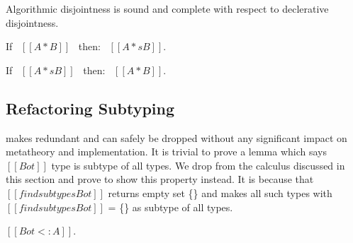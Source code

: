 Algorithmic disjointness is sound and complete with respect to declerative disjointness.

\begin{lemma}
  If \ $[[A * B]]$ \ then: \ $[[A *s B]]$.
\label{lemma:inter:disj-sound}
\end{lemma}

\begin{lemma}
  If \ $[[A *s B]]$ \ then: \ $[[A * B]]$.
\label{lemma:inter:disj-complete}
\end{lemma}


\subsection{Refactoring Subtyping}
\label{sec:inter:refactoring}
 makes  redundant and  can safely be dropped without any significant
impact on metatheory and implementation. It is trivial to prove a lemma which says $[[Bot]]$ type is
subtype of all types. We drop  from the calculus discussed in this section
and prove  to show this property instead. It is because that $[[findsubtypes Bot]]$
returns empty set \{\} and  makes all such types with $[[findsubtypes Bot]]$ = \{\} as
subtype of all types.

\begin{lemma}
  $[[Bot <: A]]$.
\label{lemma:inter:bls}
\end{lemma}
